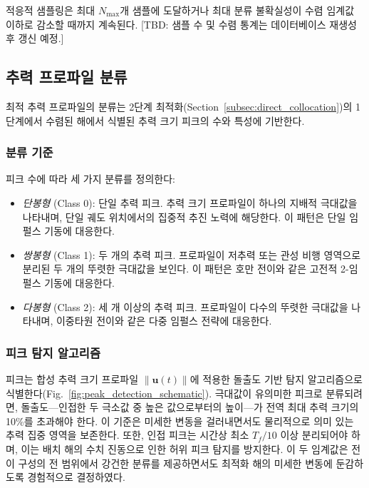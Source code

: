 적응적 샘플링은 최대 $N_{\text{max}}$개 샘플에 도달하거나 최대 분류 불확실성이 수렴 임계값 이하로 감소할 때까지 계속된다. [TBD: 샘플 수 및 수렴 통계는 데이터베이스 재생성 후 갱신 예정.]

\subsection{추력 프로파일 분류}\label{subsec:classification}

최적 추력 프로파일의 분류는 2단계 최적화(Section~\ref{subsec:direct_collocation})의 1단계에서 수렴된 해에서 식별된 추력 크기 피크의 수와 특성에 기반한다.

\subsubsection{분류 기준}

피크 수에 따라 세 가지 분류를 정의한다:

\begin{itemize}
\item \textit{단봉형} (Class 0): 단일 추력 피크. 추력 크기 프로파일이 하나의 지배적 극대값을 나타내며, 단일 궤도 위치에서의 집중적 추진 노력에 해당한다. 이 패턴은 단일 임펄스 기동에 대응한다.

\item \textit{쌍봉형} (Class 1): 두 개의 추력 피크. 프로파일이 저추력 또는 관성 비행 영역으로 분리된 두 개의 뚜렷한 극대값을 보인다. 이 패턴은 호만 전이와 같은 고전적 2-임펄스 기동에 대응한다.

\item \textit{다봉형} (Class 2): 세 개 이상의 추력 피크. 프로파일이 다수의 뚜렷한 극대값을 나타내며, 이중타원 전이와 같은 다중 임펄스 전략에 대응한다.
\end{itemize}

\subsubsection{피크 탐지 알고리즘}

피크는 합성 추력 크기 프로파일 $\|\mathbf{u}(t)\|$에 적용한 돌출도 기반 탐지 알고리즘으로 식별한다(Fig.~\ref{fig:peak_detection_schematic}). 극대값이 유의미한 피크로 분류되려면, 돌출도---인접한 두 극소값 중 높은 값으로부터의 높이---가 전역 최대 추력 크기의 10\%를 초과해야 한다. 이 기준은 미세한 변동을 걸러내면서도 물리적으로 의미 있는 추력 집중 영역을 보존한다. 또한, 인접 피크는 시간상 최소 $T_f/10$ 이상 분리되어야 하며, 이는 배치 해의 수치 진동으로 인한 허위 피크 탐지를 방지한다. 이 두 임계값은 전이 구성의 전 범위에서 강건한 분류를 제공하면서도 최적화 해의 미세한 변동에 둔감하도록 경험적으로 결정하였다.

